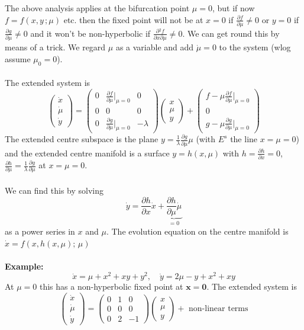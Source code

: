 \documentclass{article}
\newcommand{\example}{\textbf{Example:}}                    %
\newcommand{\bx}{\bm{x}}                                    %
\newcommand{\pder}[2] {\frac{\partial {#1}}{\partial {#2} }}%
\begin{document}
The above analysis applies at the bifurcation point $\mu=0$, but if now
$f=f(x,y\, ;\mu)$ etc. then the fixed point will not be at $x=0$ if 
$\displaystyle \pder{f}{\mu} \neq 0$ or $y=0$ if 
$\displaystyle \pder{g}{\mu} \neq 0$ and it won't be non-hyperbolic if
$\displaystyle \pder{^2 f}{x \partial \mu} \neq 0$. We can get round this
by means of a trick. We regard $\mu$ as a variable and add $\dot{\mu}=0$ to
the system (wlog assume $\mu_0=0$).
\\
\\
The extended system is
\[ \left( \begin{array}{c} \dot{x} \\ \dot{\mu} \\ \dot{y} \end{array} \right) =
\left( \begin{array}{ccr} 
0 & \pder{f}{{\mu}}|_{\mu =0} & 0 \\ 
0 & 0 & 0 \\ 
0 & \pder{g}{{\mu}}|_{\mu =0} & -\lambda \end{array} \right) 
 \left( \begin{array}{c} x \\ \mu \\ y \end{array} \right) +
 \left( \begin{array}{c}
 f - \mu \pder{f}{\mu}|_{\mu=0} \\ 0 \\
 g - \mu \pder{g}{\mu}|_{\mu =0} \end{array} \right) 
\]
The extended centre subspace is the plane 
$\displaystyle y= \frac{1}{\lambda} \pder{ g}{ \mu} \mu $ (with $E^s$ the line
$x=\mu=0$) and the extended centre manifold is a surface $y = h(x,\mu)$ with
$\displaystyle h = \pder{h}{x} =0$, $\displaystyle \pder{h}{\mu} = \frac{1}{\lambda} 
\pder{g}{\mu}$ at $x=\mu=0$.
\\
\\
We can find this by solving
\[ \dot{y} = \pder{h}{x}\dot{x} + \underbrace{\pder{h}{\mu} \dot{\mu}}_
{=0} \]
as a power series in $x$ and $\mu$. The evolution equation on the centre
manifold is $\dot{x} = f(x,h(x,\mu);\, \mu)$
\\
\\
\example\ 
\[ \dot{x} = \mu + x^2 + xy +y^2, \quad \dot{y} = 2\mu - y + x^2 +xy \]
At $\mu =0$ this has a non-hyperbolic fixed point at $\bx = \bm{0}$.
The extended system is
\[ \left( \begin{array}{c} \dot{x} \\ \dot{\mu} \\ \dot{y} \end{array} \right) =
\left( \begin{array}{ccr} 
0 & 1 & 0 \\ 
0 & 0 & 0 \\ 
0 & 2 & -1 \end{array} \right) 
 \left( \begin{array}{c} x \\ \mu \\ y \end{array} \right) +
\mbox{ non-linear terms} \]
\end{document}
